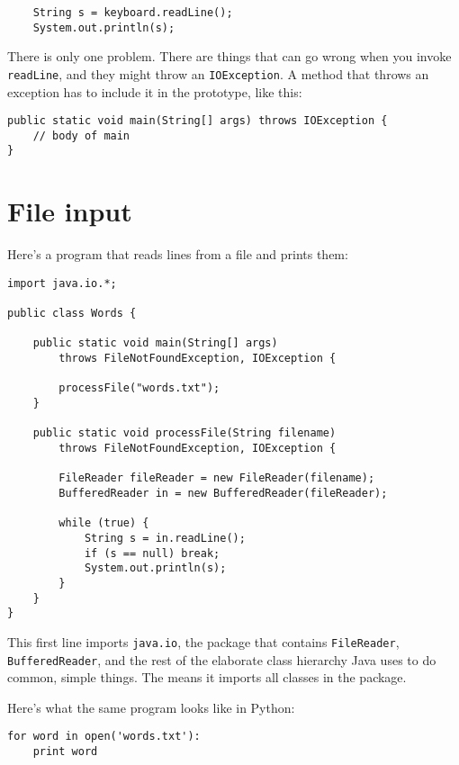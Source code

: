 \begin{lstlisting}
    String s = keyboard.readLine();
    System.out.println(s);
\end{lstlisting}
%
There is only one problem.  There are things that can go wrong when
you invoke {\tt readLine}, and they might throw an {\tt IOException}.  A
method that throws an exception has to include it in the
prototype, like this:

\begin {lstlisting}
public static void main(String[] args) throws IOException {
    // body of main
}
\end{lstlisting}


\section{File input}
\label{fileIO}

Here's a program that reads lines from a file and prints them:

\begin{lstlisting}
import java.io.*;

public class Words {

    public static void main(String[] args)
        throws FileNotFoundException, IOException {

        processFile("words.txt");
    }

    public static void processFile(String filename)
        throws FileNotFoundException, IOException {

        FileReader fileReader = new FileReader(filename);
        BufferedReader in = new BufferedReader(fileReader);

        while (true) {
            String s = in.readLine();
            if (s == null) break;
            System.out.println(s);
        }
    }
}
\end{lstlisting}

This first line imports {\tt java.io}, the package that contains
{\tt FileReader}, {\tt BufferedReader}, and the rest of
the elaborate class hierarchy Java uses to do
common, simple things.  The {\tt *} means it imports all classes
in the package.

Here's what the same program looks like in Python:

\begin{verbatim}
for word in open('words.txt'):
    print word
\end{verbatim}


